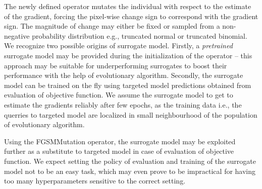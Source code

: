 The newly defined operator mutates the individual with respect to the estimate of the gradient, forcing the pixel-wise change sign to correspond with the gradient sign. The magnitude of change may either be fixed or sampled from a non-negative probability distribution e.g., truncated normal or truncated binomial. We recognize two possible origins of surrogate model. Firstly, a \emph{pretrained} surrogate model may be provided during the initialization of the operator -- this approach may be suitable for underperforming surrogates to boost their performance with the help of evolutionary algorithm. Secondly, the surrogate model can be trained on the fly using targeted model predictions obtained from evaluation of objective function. We assume the surrogate model to get to estimate the gradients reliably after few epochs, as the training data i.e., the querries to targeted model are localized in small neighbourhood of the population of evolutionary algorithm.

Using the FGSMMutation operator, the surrogate model may be exploited further as a substitute to targeted model in case of evaluation of objective function. We expect setting the policy of evaluation and training of the surrogate model not to be an easy task, which may even prove to be impractical for having too many hyperparameters sensitive to the correct setting.
